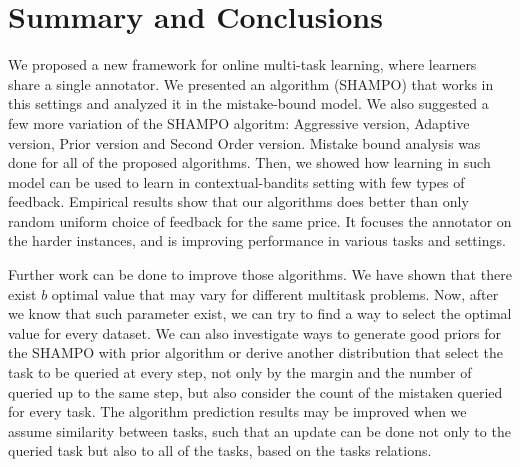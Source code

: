 \chapter{Summary and Conclusions}
We proposed a new framework for online multi-task learning, where  learners share a single annotator. 
We presented an algorithm (SHAMPO) that works in this settings and analyzed it in the mistake-bound 
model. We also suggested a few more variation of the SHAMPO algoritm: Aggressive 
version, Adaptive version, Prior version and Second Order version. Mistake bound analysis was done for all
of the proposed algorithms. 
Then, we showed how learning in such model can be used to learn in contextual-bandits setting 
with few types of feedback. Empirical results show that our algorithms does better than only random uniform
choice of feedback for the same price. 
It focuses the annotator on the harder instances, and is improving performance in various tasks and settings. 

Further work can be done  to improve those algorithms. We have shown that there exist $b$ optimal value 
that may vary for different multitask problems.  
Now, after we know that such parameter exist, we can try to find a way to select the optimal value for every dataset.  
We can also investigate ways to generate good priors for the SHAMPO with prior algorithm or derive another 
distribution that select the task to be queried at every step, not only by the margin and the number of queried 
up to the same step, but also consider the count of the mistaken queried for every task. 
The algorithm prediction results may be improved when we assume similarity between tasks, such that an 
update can be done not only  to the queried task but also to all of the tasks, 
based on the tasks relations.

